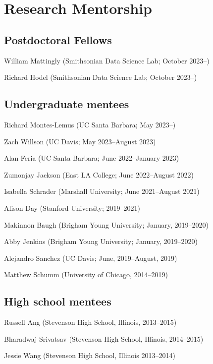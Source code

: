 \documentclass[letterpaper]{article}
\renewenvironment{itemize}{
  \begin{list}{}{
    \setlength{\leftmargin}{1.5em}
  }
}{
  \end{list}
}
\begin{document}
\section*{Research Mentorship}
\subsection*{Postdoctoral Fellows}
\begin{itemize}
\item William Mattingly (Smithsonian Data Science Lab; October 2023--)
\item Richard Hodel (Smithsonian Data Science Lab; October 2023--)
\end{itemize}
\subsection*{Undergraduate mentees}
\begin{itemize}
\item Richard Montes-Lemus (UC Santa Barbara; May 2023--)
\item Zach Willson (UC Davis; May 2023--August 2023)
\item Alan Feria (UC Santa Barbara; June 2022--January 2023)
\item Zumonjay Jackson (East LA College; June 2022--August 2022)
\item Isabella Schrader (Marshall University; June 2021--August 2021)
\item Alison Day (Stanford University; 2019--2021)
\item Makinnon Baugh (Brigham Young University; January, 2019--2020)
\item Abby Jenkins (Brigham Young University; January, 2019--2020)
\item Alejandro Sanchez (UC Davis; June, 2019--August, 2019)
\item Matthew Schumm (University of Chicago, 2014--2019)
\end{itemize}
\subsection*{High school mentees}
\begin{itemize}
\item Russell Ang (Stevenson High School, Illinois, 2013--2015)
\item Bharadwaj Srivatsav (Stevenson High School, Illinois, 2014--2015)
\item Jessie Wang (Stevenson High School, Illinois 2013--2014)
\end{itemize}
\end{document}
